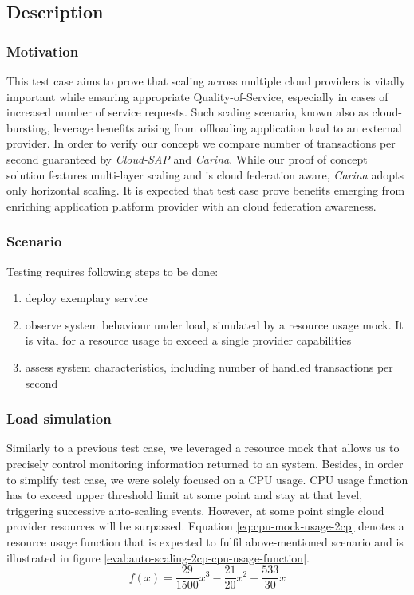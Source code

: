 \subsection*{Description}

\subsubsection{Motivation} This test case aims to prove that scaling across multiple cloud providers is vitally important while ensuring appropriate Quality-of-Service, especially in cases of increased number of service requests. Such scaling scenario, known also as cloud-bursting, leverage benefits arising from offloading application load to an external provider. In order to verify our concept we compare number of transactions per second guaranteed by \emph{Cloud-SAP} and \emph{Carina}. While our proof of concept solution features multi-layer scaling and is cloud federation aware, \emph{Carina} adopts only horizontal scaling. It is expected that test case prove benefits emerging from enriching application platform provider with an cloud federation awareness.
 
\subsubsection{Scenario}
Testing requires following steps to be done:
\begin{enumerate}
\item deploy exemplary service
\item observe system behaviour under load, simulated by a resource usage mock. It is vital for a resource usage to exceed a single provider capabilities
\item assess system characteristics, including number of handled transactions per second
\end{enumerate}

\subsubsection*{Load simulation}
Similarly to a previous test case, we leveraged a resource mock that allows us to precisely control monitoring information returned to an system. Besides, in order to simplify test case, we were solely focused on a CPU usage. CPU usage function has to exceed upper threshold limit at some point and stay at that level, triggering successive auto-scaling events. However, at some point single cloud provider resources will be surpassed. Equation \eqref{eq:cpu-mock-usage-2cp} denotes a resource usage function that is expected to fulfil above-mentioned scenario and is illustrated in figure \ref{eval:auto-scaling-2cp-cpu-usage-function}.
\begin{equation}
 f(x) = \frac{29}{1500}x^3-\frac{21}{20}x^2+\frac{533}{30}x
 \label{eq:cpu-mock-usage-2cp}
\end{equation}

